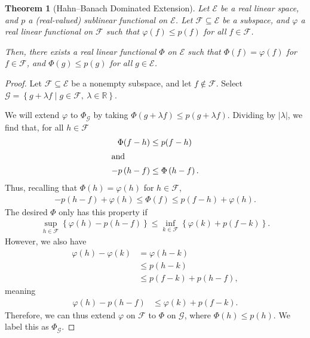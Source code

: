 \documentclass[12pt]{extarticle}
\newcommand{\R}{\mathbb{R}}
\newcommand{\set}[1]{\left\{#1\right\}}
\theoremstyle{plain}
\newtheorem*{theorem}{Theorem}
\theoremstyle{definition}
\theoremstyle{note}
\renewcommand{\newline}{\hfill\break}
\begin{document}
\begin{theorem}[Hahn--Banach Dominated Extension]
  Let $\mathcal{E}$ be a real linear space, and $p$ a (real-valued) sublinear functional on $\mathcal{E}$. Let $\mathcal{F}\subseteq \mathcal{E}$ be a subspace, and $\varphi$ a real linear functional on $\mathcal{F}$ such that $\varphi(f) \leq p(f)$ for all $f\in \mathcal{F}$.\newline

  Then, there exists a real linear functional $\Phi$ on $\mathcal{E}$ such that $\Phi(f) = \varphi(f)$ for $f\in \mathcal{F}$, and $\Phi(g) \leq p(g)$ for all $g\in \mathcal{E}$.
\end{theorem}
\begin{proof}
  Let $\mathcal{F}\subseteq \mathcal{E}$ be a nonempty subspace, and let $f\notin \mathcal{F}$. Select $\mathcal{G} = \set{g + \lambda f\mid g\in \mathcal{F},~\lambda \in \R}$.\newline

  We will extend $\varphi$ to $\Phi_{\mathcal{G}}$ by taking $\Phi(g + \lambda f)\leq p(g + \lambda f)$. Dividing by $|\lambda|$, we find that, for all $h\in \mathcal{F}$
  \begin{align*}
    \Phi(f - h) &\leq p(f - h)\\
    \intertext{and}
    -p\left(h - f\right)&\leq \Phi\left(h - f\right).
  \end{align*}
  Thus, recalling that $\Phi(h) = \varphi(h)$ for $h\in \mathcal{F}$,
  \begin{align*}
    -p\left(h-f\right) + \varphi(h) \leq \Phi\left(f\right) \leq p(f-h) + \varphi(h).
  \end{align*}
  The desired $\Phi$ only has this property if
  \begin{align*}
    \sup_{h\in \mathcal{F}}\set{\varphi(h) - p(h-f)} \leq \inf_{k\in \mathcal{F}}\set{\varphi(k) + p(f-k)}.
  \end{align*}
  However, we also have
  \begin{align*}
    \varphi(h)- \varphi(k) &= \varphi(h-k)\\
                           &\leq p(h-k)\\
                           &\leq p(f-k) + p(h-f),
  \end{align*}
  meaning
  \begin{align*}
    \varphi(h) - p(h-f) &\leq \varphi(k) + p(f-k).
  \end{align*}
  Therefore, we can thus extend $\varphi$ on $\mathcal{F}$ to $\Phi$ on $\mathcal{G}$, where $\Phi(h) \leq p(h)$. We label this as $\Phi_{\mathcal{G}}$.\newline


\end{proof}
\end{document}
